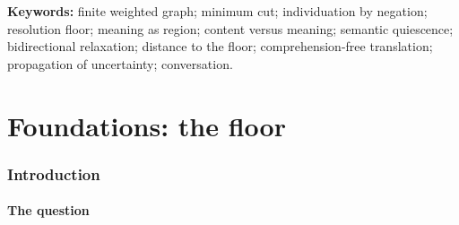 \documentclass[twocolumn,11pt,a4paper]{article}
\theoremstyle{sup}
\theoremstyle{definition}
\theoremstyle{remark}
\newcommand{\flo}{\beta}
\begin{document}
\begin{abstract}
at zero; non-halting is deep untranslatability, whose honest output is to
decline. We then prove that meaning is receiver-relative with no privileged
value (distinct decoders register distinct cells, each correct), that a
\emph{conversation} is propagation of uncertainty in which a response is forced
exactly because no point-meaning can be extracted and is steered by the demand
rather than by comprehension, and we construct the \emph{four-column
translator}: two central translation columns and two external
\emph{response} columns that externalise the propagation, so that translation
becomes the test of whether two utterances start the same conversation---an
audit of the route, not the endpoints, which a meaning-blind mechanism passes
and a false friend fails. A master equivalence binds every structure to the one
fact $\flo>0$. The development is offered as the structural common form beneath
the indeterminacy of translation, radical interpretation, conversational
implicature, and meaning-as-use; we prove everything of the abstract graph
alone, and confine interpretation to remarks.
\end{abstract}

\noindent\textbf{Keywords:} finite weighted graph; minimum cut; individuation
by negation; resolution floor; meaning as region; content versus meaning;
semantic quiescence; bidirectional relaxation; distance to the floor;
comprehension-free translation; propagation of uncertainty; conversation.

\tableofcontents

\part{Foundations: the floor}

\section{Introduction}
\label{sec:intro}

\subsection{The question}
\end{document}
